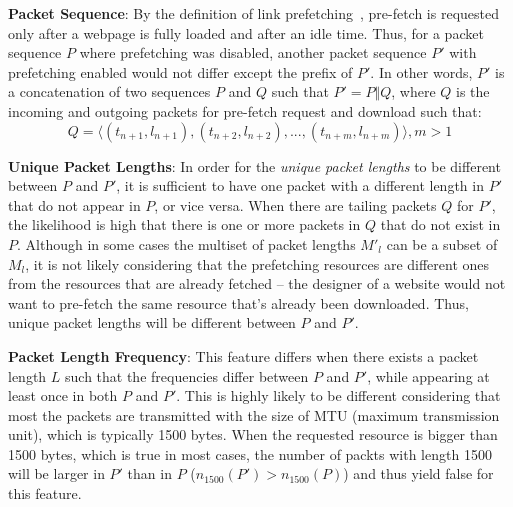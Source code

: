{\bf Packet Sequence}:
By the definition of link prefetching~\cite{fisher2014link}, pre-fetch is requested only after a webpage is fully loaded and after an idle time.
Thus, for a packet sequence $P$ where prefetching was disabled, another packet sequence $P'$ with prefetching enabled would not differ except the prefix of $P'$.
In other words, $P'$ is a concatenation of two sequences $P$ and $Q$ such that $P' = P \Vert Q$, where $Q$ is the incoming and outgoing packets for pre-fetch request and download such that:
\begin{equation}
Q = \langle(t_{n+1}, l_{n+1}), (t_{n+2}, l_{n+2}), ..., (t_{n+m}, l_{n+m})\rangle, m > 1
\end{equation}

{\bf Unique Packet Lengths}: 
In order for the {\it unique packet lengths} to be different between $P$ and $P'$, it is sufficient to have one packet with a different length in $P'$ that do not appear in $P$, or vice versa.
When there are tailing packets $Q$ for $P'$, the likelihood is high that there is one or more packets in $Q$ that do not exist in $P$.
Although in some cases the multiset of packet lengths $M'_l$ can be a subset of $M_l$, it is not likely considering that the prefetching resources are different ones from the resources that are already fetched -- the designer of a website would not want to pre-fetch the same resource that's already been downloaded.
Thus, unique packet lengths will be different between $P$ and $P'$.

{\bf Packet Length Frequency}:
This feature differs when there exists a packet length $L$ such that the frequencies differ between $P$ and $P'$, while appearing at least once in both $P$ and $P'$.
This is highly likely to be different considering that most the packets are transmitted with the size of MTU (maximum transmission unit), which is typically 1500 bytes.
When the requested resource is bigger than 1500 bytes, which is true in most cases, the number of packts with length 1500 will be larger in $P'$ than in $P$ ($n_{1500}(P') > n_{1500}(P)$) and thus yield false for this feature.

